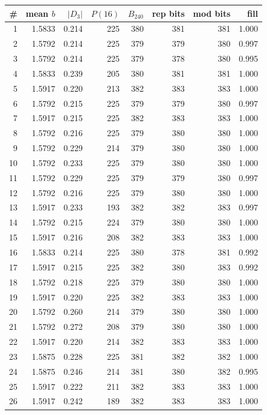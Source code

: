 \documentclass[10pt]{article}
\begin{document}
\begin{longtable}{rrrrrrrr}
\toprule
\# & mean $b$ & $|D_3|$ & $P(16)$ & $B_{240}$ & rep bits & mod bits & fill\\
\midrule\endhead
1 & 1.5833 & 0.214 & 225 & 380 & 381 & 381 & 1.000\\
2 & 1.5792 & 0.214 & 225 & 379 & 379 & 380 & 0.997\\
3 & 1.5792 & 0.214 & 225 & 379 & 378 & 380 & 0.995\\
4 & 1.5833 & 0.239 & 205 & 380 & 381 & 381 & 1.000\\
5 & 1.5917 & 0.220 & 213 & 382 & 383 & 383 & 1.000\\
6 & 1.5792 & 0.215 & 225 & 379 & 379 & 380 & 0.997\\
7 & 1.5917 & 0.215 & 225 & 382 & 383 & 383 & 1.000\\
8 & 1.5792 & 0.216 & 225 & 379 & 380 & 380 & 1.000\\
9 & 1.5792 & 0.229 & 214 & 379 & 380 & 380 & 1.000\\
10 & 1.5792 & 0.233 & 225 & 379 & 380 & 380 & 1.000\\
11 & 1.5792 & 0.229 & 225 & 379 & 379 & 380 & 0.997\\
12 & 1.5792 & 0.216 & 225 & 379 & 380 & 380 & 1.000\\
13 & 1.5917 & 0.233 & 193 & 382 & 382 & 383 & 0.997\\
14 & 1.5792 & 0.215 & 224 & 379 & 380 & 380 & 1.000\\
15 & 1.5917 & 0.216 & 208 & 382 & 383 & 383 & 1.000\\
16 & 1.5833 & 0.214 & 225 & 380 & 378 & 381 & 0.992\\
17 & 1.5917 & 0.215 & 225 & 382 & 380 & 383 & 0.992\\
18 & 1.5792 & 0.218 & 225 & 379 & 380 & 380 & 1.000\\
19 & 1.5917 & 0.220 & 225 & 382 & 383 & 383 & 1.000\\
20 & 1.5792 & 0.260 & 214 & 379 & 380 & 380 & 1.000\\
21 & 1.5792 & 0.272 & 208 & 379 & 380 & 380 & 1.000\\
22 & 1.5917 & 0.220 & 214 & 382 & 383 & 383 & 1.000\\
23 & 1.5875 & 0.228 & 225 & 381 & 382 & 382 & 1.000\\
24 & 1.5875 & 0.246 & 214 & 381 & 380 & 382 & 0.995\\
25 & 1.5917 & 0.222 & 211 & 382 & 383 & 383 & 1.000\\
26 & 1.5917 & 0.242 & 189 & 382 & 383 & 383 & 1.000\\

\end{longtable}
\end{document}
